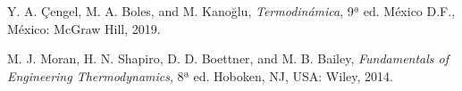 \documentclass[conference]{IEEEtran}
\theoremstyle{mytheoremstyle}
\theoremstyle{mytheoremstyle}
\theoremstyle{myproblemstyle}
\begin{document}
\begin{thebibliography}{1}
    Y. A. Çengel, M. A. Boles, and M. Kanoğlu, \emph{Termodinámica}, 9ª ed. México D.F., México: McGraw Hill, 2019.
    \label{CengelBoles2019}

    M. J. Moran, H. N. Shapiro, D. D. Boettner, and M. B. Bailey, \emph{Fundamentals of Engineering Thermodynamics}, 8ª ed. Hoboken, NJ, USA: Wiley, 2014.
    \label{MoranShapiro2014}

\end{thebibliography}
\end{document}
